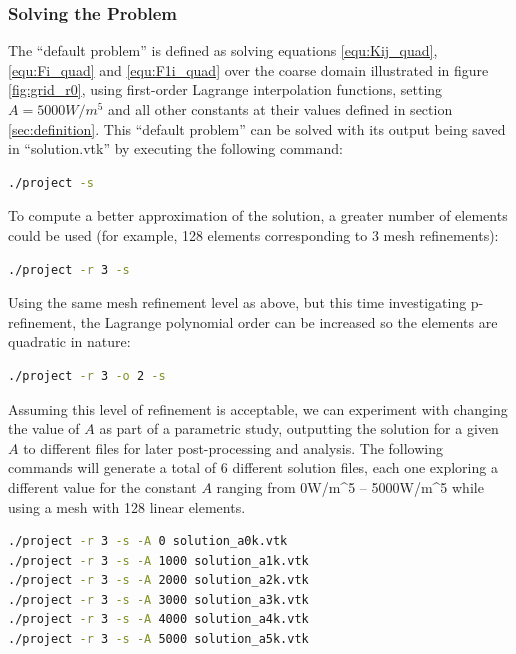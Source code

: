 \documentclass[letterpaper,10pt]{article}
\begin{document}
\subsubsection{Solving the Problem}
The ``default problem'' is defined as solving equations \ref{equ:Kij_quad}, \ref{equ:Fi_quad} and \ref{equ:F1i_quad} over the coarse domain illustrated in figure \ref{fig:grid_r0}, using first-order Lagrange interpolation functions, setting $A=\unit{5000}{W/m^5}$ and all other constants at their values defined in section \ref{sec:definition}. This ``default problem'' can be solved with its output being saved in ``solution.vtk'' by executing the following command:
\vspace{-6mm}
\begin{lstlisting}[numbers=none,frame=none,language=bash]
./project -s
\end{lstlisting}
\vspace{1mm}

To compute a better approximation of the solution, a greater number of elements could be used (for example, 128 elements corresponding to 3 mesh refinements):
\vspace{-6mm}
\begin{lstlisting}[numbers=none,frame=none,language=bash]
./project -r 3 -s
\end{lstlisting}
\vspace{1mm}

Using the same mesh refinement level as above, but this time investigating p-refinement, the Lagrange polynomial order can be increased so the elements are quadratic in nature:
\vspace{-6mm}
\begin{lstlisting}[numbers=none,frame=none,language=bash]
./project -r 3 -o 2 -s
\end{lstlisting}
\vspace{1mm}

Assuming this level of refinement is acceptable, we can experiment with changing the value of $A$ as part of a parametric study, outputting the solution for a given $A$ to different files for later post-processing and analysis. The following commands will generate a total of 6 different solution files, each one exploring a different value for the constant $A$ ranging from \unit{0}{W/m^5} -- \unit{5000}{W/m^5} while using a mesh with 128 linear elements.
\vspace{-6mm}
\begin{lstlisting}[numbers=none,frame=none,language=bash]
./project -r 3 -s -A 0 solution_a0k.vtk
./project -r 3 -s -A 1000 solution_a1k.vtk
./project -r 3 -s -A 2000 solution_a2k.vtk
./project -r 3 -s -A 3000 solution_a3k.vtk
./project -r 3 -s -A 4000 solution_a4k.vtk
./project -r 3 -s -A 5000 solution_a5k.vtk
\end{lstlisting}
\vspace{1mm}
\end{document}
